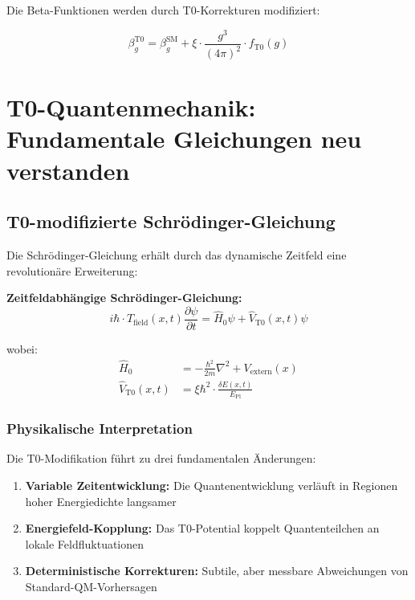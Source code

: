 \documentclass[12pt,a4paper]{article}
\newcommand{\xipar}{\xi}
\newcommand{\deltaE}{\delta E}
\begin{document}
	Die Beta-Funktionen werden durch T0-Korrekturen modifiziert:
	
	\begin{equation}
		\beta_g^{\text{T0}} = \beta_g^{\text{SM}} + \xipar \cdot \frac{g^3}{(4\pi)^2} \cdot f_{\text{T0}}(g)
	\end{equation}
	
	\section{T0-Quantenmechanik: Fundamentale Gleichungen neu verstanden}
	
	\subsection{T0-modifizierte Schrödinger-Gleichung}
	
	Die Schrödinger-Gleichung erhält durch das dynamische Zeitfeld eine revolutionäre Erweiterung:
	
	\begin{tcolorbox}[colback=cyan!5!white,colframe=cyan!75!black,title=T0-Schrödinger-Gleichung]
		\textbf{Zeitfeldabhängige Schrödinger-Gleichung:}
		\begin{equation}
			i\hbar \cdot T_{\text{field}}(x,t) \frac{\partial\psi}{\partial t} = \hat{H}_0 \psi + \hat{V}_{\text{T0}}(x,t) \psi
		\end{equation}
		
		wobei:
		\begin{align}
			\hat{H}_0 &= -\frac{\hbar^2}{2m} \nabla^2 + V_{\text{extern}}(x) \\
			\hat{V}_{\text{T0}}(x,t) &= \xipar \hbar^2 \cdot \frac{\deltaE(x,t)}{E_{\text{Pl}}}
		\end{align}
	\end{tcolorbox}
	
	\subsubsection{Physikalische Interpretation}
	
	Die T0-Modifikation führt zu drei fundamentalen Änderungen:
	
	\begin{enumerate}
		\item \textbf{Variable Zeitentwicklung:} Die Quantenentwicklung verläuft in Regionen hoher Energiedichte langsamer
		\item \textbf{Energiefeld-Kopplung:} Das T0-Potential koppelt Quantenteilchen an lokale Feldfluktuationen
		\item \textbf{Deterministische Korrekturen:} Subtile, aber messbare Abweichungen von Standard-QM-Vorhersagen
	\end{enumerate}
	
\end{document}
